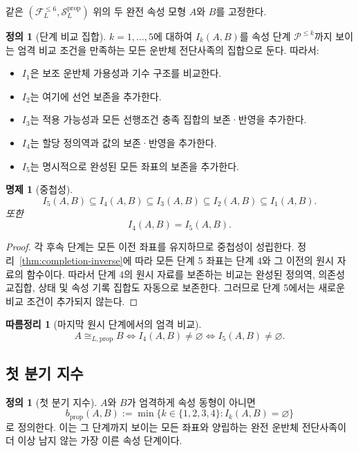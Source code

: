 \documentclass[11pt]{article}
\newcommand{\FVI}{\mathcal F_{L}^{\le 6}}
\newcommand{\Sprop}{\mathcal S_{L}^{\mathrm{prop}}}
\newtheorem{proposition}[theorem]{명제}
\newtheorem{corollary}[theorem]{따름정리}
\theoremstyle{definition}
\newtheorem{definition}[theorem]{정의}
\theoremstyle{remark}
\begin{document}
같은 \((\FVI,\Sprop)\) 위의 두 완전 속성 모형 \(A\)와 \(B\)를 고정한다.

\begin{definition}[단계 비교 집합]
\(k=1,\ldots,5\)에 대하여 \(I_k(A,B)\)를 속성 단계 \(\mathcal P^{\le k}\)까지 보이는 엄격 비교 조건을 만족하는 모든 운반체 전단사족의 집합으로 둔다.
따라서:
\begin{itemize}
\item \(I_1\)은 보조 운반체 가용성과 기수 구조를 비교한다.
\item \(I_2\)는 여기에 선언 보존을 추가한다.
\item \(I_3\)는 적용 가능성과 모든 선행조건 충족 집합의 보존·반영을 추가한다.
\item \(I_4\)는 할당 정의역과 값의 보존·반영을 추가한다.
\item \(I_5\)는 명시적으로 완성된 모든 좌표의 보존을 추가한다.
\end{itemize}
\end{definition}

\begin{proposition}[중첩성]
\[
I_5(A,B)\subseteq I_4(A,B)\subseteq I_3(A,B)\subseteq I_2(A,B)\subseteq I_1(A,B).
\]
또한
\[
I_4(A,B)=I_5(A,B).
\]
\end{proposition}

\begin{proof}
각 후속 단계는 모든 이전 좌표를 유지하므로 중첩성이 성립한다.
정리~\ref{thm:completion-inverse}에 따라 모든 단계 5 좌표는 단계 4와 그 이전의 원시 자료의 함수이다.
따라서 단계 4의 원시 자료를 보존하는 비교는 완성된 정의역, 의존성 교집합, 상태 및 속성 기록 집합도 자동으로 보존한다.
그러므로 단계 5에서는 새로운 비교 조건이 추가되지 않는다.
\end{proof}

\begin{corollary}[마지막 원시 단계에서의 엄격 비교]
\[
A\cong_{L,\mathrm{prop}}B
\Longleftrightarrow
I_4(A,B)\neq\varnothing
\Longleftrightarrow
I_5(A,B)\neq\varnothing.
\]
\end{corollary}

\subsection{첫 분기 지수}

\begin{definition}[첫 분기 지수]
\(A\)와 \(B\)가 엄격하게 속성 동형이 아니면
\[
b_{\mathrm{prop}}(A,B):=
\min\{k\in\{1,2,3,4\}:I_k(A,B)=\varnothing\}
\]
로 정의한다.
이는 그 단계까지 보이는 모든 좌표와 양립하는 완전 운반체 전단사족이 더 이상 남지 않는 가장 이른 속성 단계이다.
\end{definition}
\end{document}
